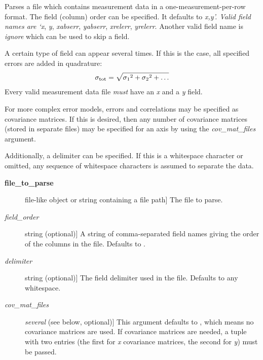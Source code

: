 \documentclass[a4paper,10pt,english]{sphinxmanual}
\begin{document}

\begin{fulllineitems}
\label{index:kafe.file_tools.parse_column_data}
Parses a file which contains measurement data in a one-measurement-per-row
format. The field (column) order can be specified. It defaults to \emph{x,y'.
Valid field names are {}`x}, \emph{y}, \emph{xabserr}, \emph{yabserr}, \emph{xrelerr},
\emph{yrelerr}. Another valid field name is \emph{ignore} which can be used to skip
a field.

A certain type of field can appear several times. If this is the case, all
specified errors are added in quadrature:
\begin{gather}
\begin{split}\sigma_{\text{tot}} = \sqrt{{\sigma_1}^2+{\sigma_2}^2+\dots}\end{split}\notag
\end{gather}
Every valid measurement data file \emph{must} have an \emph{x} and a \emph{y} field.

For more complex error models, errors and correlations may be specified as
covariance matrices. If this is desired, then any number of covariance
matrices (stored in separate files) may be specified for an axis by
using the \emph{cov\_mat\_files} argument.

Additionally, a delimiter can be specified. If this is a whitespace
character or omitted, any sequence of whitespace characters is assumed to
separate the data.
\begin{description}
\item[{\textbf{file\_to\_parse}}] \leavevmode{[}file-like object or string containing a file path{]}
The file to parse.

\item[{\emph{field\_order}}] \leavevmode{[}string (optional){]}
A string of comma-separated field names giving the order of the columns
in the file. Defaults to .

\item[{\emph{delimiter}}] \leavevmode{[}string (optional){]}
The field delimiter used in the file. Defaults to any whitespace.

\item[{\emph{cov\_mat\_files}}] \leavevmode{[}\emph{several} (see below, optional){]}
This argument defaults to , which means no covariance matrices
are used. If covariance matrices are needed, a tuple with two entries
(the first for \emph{x} covariance matrices, the second for \emph{y}) must be
passed.


\end{description}
\end{fulllineitems}
\end{document}
